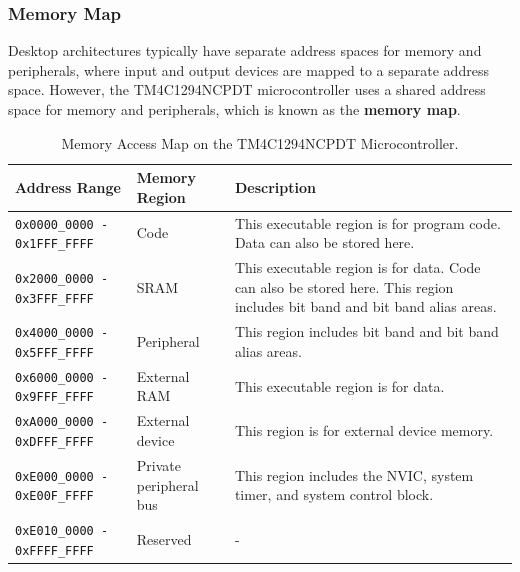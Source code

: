 \documentclass{article}
\begin{document}
\subsubsection{Memory Map}
Desktop architectures typically have separate address spaces for memory
and peripherals, where input and output devices are mapped to a
separate address space. However, the TM4C1294NCPDT microcontroller uses
a shared address space for memory and peripherals, which is known as
the \textbf{memory map}.
\begin{table}[H]
    \centering
    \begin{tabular}{llp{5cm}}
        \toprule
        \textbf{Address Range}                       & \textbf{Memory Region} & \textbf{Description}                                                                                                      \\
        \midrule
        \texttt{0x0000_0000 - 0x1FFF_FFFF} & Code                   & This executable region is for program code. Data can also be stored here.                                                 \\
        \texttt{0x2000_0000 - 0x3FFF_FFFF} & SRAM                   & This executable region is for data. Code can also be stored here. This region includes bit band and bit band alias areas. \\
        \texttt{0x4000_0000 - 0x5FFF_FFFF} & Peripheral             & This region includes bit band and bit band alias areas.                                                                   \\
        \texttt{0x6000_0000 - 0x9FFF_FFFF} & External RAM           & This executable region is for data.                                                                                       \\
        \texttt{0xA000_0000 - 0xDFFF_FFFF} & External device        & This region is for external device memory.                                                                                \\
        \texttt{0xE000_0000 - 0xE00F_FFFF} & Private peripheral bus & This region includes the NVIC, system timer, and system control block.                                                    \\
        \texttt{0xE010_0000 - 0xFFFF_FFFF} & Reserved               & -                                                                                                                         \\
        \bottomrule
    \end{tabular}
    \caption{Memory Access Map on the TM4C1294NCPDT Microcontroller.}
\end{table}
\end{document}
